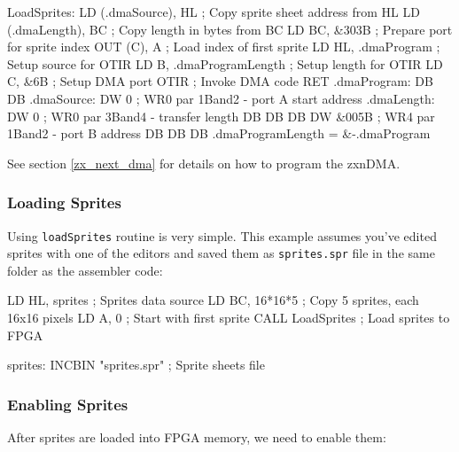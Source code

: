 \begin{tcblisting}{}
LoadSprites:
	LD (.dmaSource), HL     ; Copy sprite sheet address from HL
	LD (.dmaLength), BC     ; Copy length in bytes from BC
	LD BC, &303B            ; Prepare port for sprite index
	OUT (C), A              ; Load index of first sprite
	LD HL, .dmaProgram      ; Setup source for OTIR
	LD B, .dmaProgramLength ; Setup length for OTIR
	LD C, &6B               ; Setup DMA port
	OTIR                    ; Invoke DMA code
	RET
.dmaProgram:
	DB %
	DB %
.dmaSource:
	DW 0                    ; WR0 par 1Band2 - port A start address
.dmaLength:
	DW 0                    ; WR0 par 3Band4 - transfer length
	DB %
	DB %
	DB %
	DW &005B                ; WR4 par 1Band2 - port B address
	DB %
	DB %
	DB %
.dmaProgramLength = &-.dmaProgram
\end{tcblisting}

See section \ref{zx_next_dma} for details on how to program the zxnDMA.


\pagebreak
\subsubsection{Loading Sprites}

Using {\tt loadSprites} routine is very simple. This example assumes you've edited sprites with one of the editors and saved them as {\tt sprites.spr} file in the same folder as the assembler code:

\begin{tcblisting}{}
	LD HL, sprites          ; Sprites data source
	LD BC, 16*16*5          ; Copy 5 sprites, each 16x16 pixels
	LD A, 0                 ; Start with first sprite
	CALL LoadSprites        ; Load sprites to FPGA

sprites:
	INCBIN "sprites.spr"    ; Sprite sheets file
\end{tcblisting}


\subsubsection{Enabling Sprites}

After sprites are loaded into FPGA memory, we need to enable them:

